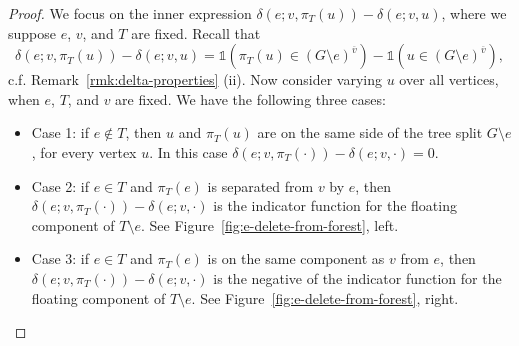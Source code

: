 \documentclass[12pt]{amsart}
\theoremstyle{definition}
\newcommand{\one}{\mathds{1}}
\begin{document}
\begin{proof}
We focus on the inner expression $\delta(e; v, \pi_T(u)) - \delta(e; v, u)$,
where we suppose $e$, $v$, and $T$ are fixed.
Recall that
\begin{equation}
\label{eq:delta-diff}
	\delta(e; v, \pi_T(u)) - \delta(e; v, u) 
	= \one(\pi_T(u) \in (G \setminus e)^{\overline v}) - \one( u \in (G \setminus e)^{\overline v}) ,
\end{equation}
c.f. Remark~\ref{rmk:delta-properties} (ii).
Now consider varying $u$ over all vertices, when $e$, $T$, and $v$ are fixed.
We have the following three cases:

\begin{itemize}[leftmargin=*]
\item Case 1: if $e \not \in T$, then $u$ and $\pi_T(u)$ are on the same side of the tree split $G \setminus e$, for every vertex $u$.
In this case $\delta(e;v, \pi_T(\cdot)) - \delta(e; v, \cdot) = 0$.

\item Case 2: if $e \in T$ and $\pi_T(e)$ is separated from $v$ by $e$, then $\delta(e;v, \pi_T(\cdot)) - \delta(e; v, \cdot)$ is the indicator function for the floating component of $T \setminus e$. See Figure~\ref{fig:e-delete-from-forest}, left.

\item Case 3: if $e \in T$ and $\pi_T(e)$ is on the same component as $v$ from $e$, then $\delta(e;v, \pi_T(\cdot)) - \delta(e; v, \cdot)$ is the negative of the indicator function for the floating component of $T \setminus e$. See Figure~\ref{fig:e-delete-from-forest}, right.
\end{itemize}
\begin{figure}[h]
\begin{minipage}{0.45\textwidth}
\centering
\end{minipage}
\end{figure}
\end{proof}
\end{document}
